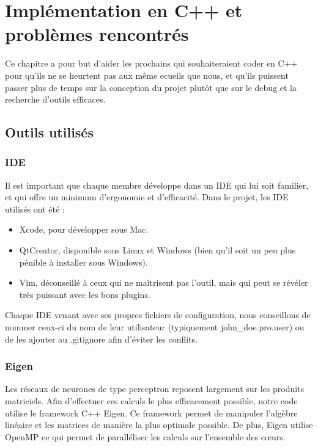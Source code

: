 \chapter{Implémentation en C++ et problèmes rencontrés}

Ce chapitre a pour but d'aider les prochains qui souhaiteraient coder en C++ pour qu'ils ne se heurtent pas aux même ecueils que nous, et qu'ils puissent passer plus de temps sur la conception du projet plutôt que sur le debug et la recherche d'outils efficaces.

\section{Outils utilisés}

\subsection{IDE}

Il est important que chaque membre développe dans un IDE qui lui soit familier, et qui offre un minimum d'ergonomie et d'efficacité. Dans le projet, les IDE utilisés ont été :
\begin{itemize}
    \item Xcode, pour développer sous Mac. 
    \item QtCreator, disponible sous Linux et Windows (bien qu'il soit un peu plus pénible à installer sous Windows).
    \item Vim, déconseillé à ceux qui ne maîtrisent pas l'outil, mais qui peut se révéler très puissant avec les bons plugins.
\end{itemize}

Chaque IDE venant avec ses propres fichiers de configuration, nous conseillons de nommer ceux-ci du nom de leur utilisateur (typiquement john\_doe.pro.user) ou de les ajouter au .gitignore afin d'éviter les conflits.

\subsection{Eigen}

Les réseaux de neurones de type perceptron reposent largement sur les produits matriciels. Afin d'effectuer ces calculs le plus efficacement possible, notre code utilise le framework C++ Eigen. Ce framework permet de manipuler l'algèbre linéaire et les matrices de manière la plus optimale possible. De plus, Eigen utilise OpenMP ce qui permet de paralléliser les calculs sur l'ensemble des cœurs. 

